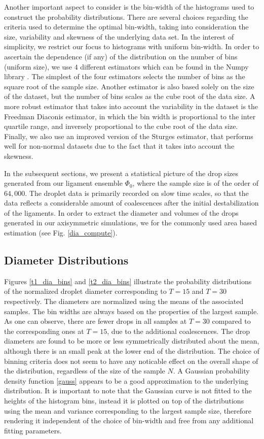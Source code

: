 Another important aspect to consider is the bin-width of the 
histograms used to construct the probability distributions. 
There are several choices regarding the criteria used to determine the optimal bin-width, 
taking into consideration the size, variability and skewness of the underlying data set. 
In the interest of simplicity, we restrict our focus to histograms with uniform bin-width. 
In order to ascertain the dependence (if any) of the distribution on the number of bins  
(uniform size), we use $4$ different estimators which can be found in the Numpy library \cite{numpy}.
The simplest of the four estimators selects the number 
of bins as the square root of the sample size.
Another estimator is also based solely on the size of the dataset, 
but the number of bins scales as the cube root of the data size.  
A more robust estimator that takes into account the variability in the dataset
is the Freedman Diaconis estimator, in which the bin width is proportional to the 
inter quartile range, and inversely proportional to the cube root of the data size. 
Finally, we also use an improved version of the Sturges estimator, that performs 
well for non-normal datasets due to the fact that it takes into account the skewness. 

In the subsequent sections, we present a statistical picture of the drop sizes generated 
from our ligament ensemble $\Phi_0$, where the sample size is of the order of $64,000$.
The droplet data is primarily recorded on slow time scales, so that the data reflects 
a considerable amount of coalescences after the initial destabilization of the ligaments. 
In order to extract the diameter and volumes of the drops generated in our axisymmetric
simulations, we for the commonly used area based estimation (see Fig. \ref{dia_compute}).


\subsection*{Diameter Distributions}

Figures \ref{t1_dia_bins} and \ref{t2_dia_bins} illustrate the probability distributions
of the normalized droplet diameter corresponding to $T=15$ and $T=30$ respectively. 
The diameters are normalized using the means of the associated samples. 
The bin widths are always based on the properties of the largest sample.
As one can observe, there are fewer drops in all samples at $T=30$ 
compared to the corresponding ones at $T=15$, due to the additional coalescences.  
The drop diameters are found to be more or less symmetrically distributed about the mean,
although there is an small peak at the lower end of the distribution.
The choice of binning criteria does not seem to have any noticable effect on the 
overall shape of the distribution, regardless of the size of the sample $N$.   
A Gaussian probability density function \eqref{gauss} appears to be a good 
approximation to the underlying distribution.
It is important to note that the Gaussian curve is not fitted to the heights of the 
histogram bins, instead it is plotted on top of the distributions using the mean and 
variance corresponding to the largest sample size, therefore rendering it independent
of the choice of bin-width and free from any additional fitting parameters.  


